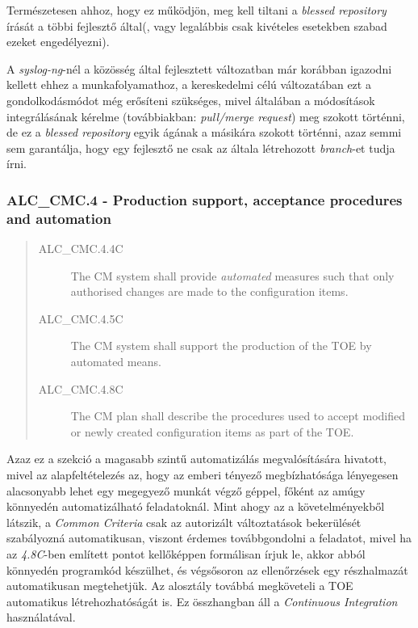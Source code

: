 Természetesen ahhoz, hogy ez működjön, meg kell tiltani a \emph{blessed repository} írását a többi
fejlesztő által(, vagy legalábbis csak kivételes esetekben szabad ezeket engedélyezni).

A \emph{syslog-ng}-nél a közösség által fejlesztett változatban már korábban igazodni kellett ehhez
a munkafolyamathoz, a kereskedelmi célú változatában ezt a gondolkodásmódot még erősíteni szükséges,
mivel általában a módosítások integrálásának kérelme (továbbiakban: \emph{pull/merge request}) meg
szokott történni, de ez a \emph{blessed repository} egyik ágának a másikára szokott történni, azaz
semmi sem garantálja, hogy egy fejlesztő ne csak az általa létrehozott \emph{branch}-et tudja írni.

\pagebreak[1]
\subsubsection{ALC\_CMC.4 - Production support, acceptance procedures and automation }
\begin{quote}
    \begin{description}
        \item[ALC\_CMC.4.4C]{The CM system shall provide \emph{automated} measures such that only
            authorised changes are made to the configuration items.}
        \item[ALC\_CMC.4.5C]{The CM system shall support the production of the TOE by automated
            means.}
        \item[ALC\_CMC.4.8C]{The CM plan shall describe the procedures used to accept modified or
            newly created configuration items as part of the TOE.}
    \end{description}
\end{quote}

Azaz ez a szekció a magasabb szintű automatizálás megvalósítására hivatott, mivel az
alapfeltételezés az, hogy az emberi tényező megbízhatósága lényegesen alacsonyabb lehet egy
megegyező munkát végző géppel, főként az amúgy könnyedén automatizálható feladatoknál.  Mint ahogy
az a követelményekből látszik, a \emph{Common Criteria} csak az autorizált változtatások bekerülését
szabályozná automatikusan, viszont érdemes továbbgondolni a feladatot, mivel ha az \emph{4.8C}-ben
említett pontot kellőképpen formálisan írjuk le, akkor abból könnyedén programkód készülhet, és
végsősoron az ellenőrzések egy részhalmazát automatikusan megtehetjük.  Az alosztály továbbá
megköveteli a TOE automatikus létrehozhatóságát is. Ez összhangban áll a \emph{Continuous
Integration} használatával. 

